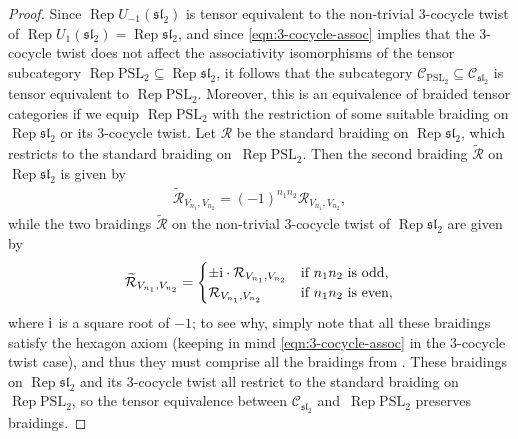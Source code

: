 \documentclass[pdftex]{sigma}
\numberwithin{equation}{section}
\theoremstyle{definition}
\begin{document}
\begin{proof}
Since $\operatorname{Rep} U_{-1}(\mathfrak{sl}_2)$ is tensor equivalent to the non-trivial $3$-cocycle twist of $\operatorname{Rep} U_1(\mathfrak{sl}_2)=\operatorname{Rep} \mathfrak{sl}_2$, and since \eqref{eqn:3-cocycle-assoc} implies that the $3$-cocycle twist does not affect the associativity isomorphisms of the tensor subcategory $\operatorname{Rep} \mathrm{PSL}_2\subseteq \operatorname{Rep}\mathfrak{sl}_2$, it follows that the subcategory $\mathcal{C}_{\mathrm{PSL}_2}\subseteq\mathcal{C}_{\mathfrak{sl}_2}$ is tensor equivalent to $\operatorname{Rep} \mathrm{PSL}_2$.
Moreover, this is an equivalence of braided tensor categories if we equip $\operatorname{Rep} \mathrm{PSL}_2$ with the restriction of some suitable braiding on $\operatorname{Rep} \mathfrak{sl}_2$ or its $3$-cocycle twist.
Let $\mathcal{R}$ be the standard braiding on $\operatorname{Rep} \mathfrak{sl}_2$, which restricts to the standard braiding on~$\operatorname{Rep} \mathrm{PSL}_2$. Then the second braiding $\widetilde{\mathcal{R}}$ on~$\operatorname{Rep} \mathfrak{sl}_2$ is given by
\begin{gather*}
\widetilde{\mathcal{R}}_{V_{n_1},V_{n_2}} = (-1)^{n_1 n_2}\mathcal{R}_{V_{n_1},V_{n_2}},
\end{gather*}
while the two braidings $\widetilde{\mathcal{R}}$ on the non-trivial $3$-cocycle twist of $\operatorname{Rep} \mathfrak{sl}_2$ are given by
\begin{gather*}
\widetilde{\mathcal{R}}_{V_{n_1},V_{n_2}} =\begin{cases}
\pm {\rm i}\cdot\mathcal{R}_{V_{n_1},V_{n_2}} & \text{if } n_1 n_2 \text{ is odd},\\
\mathcal{R}_{V_{n_1},V_{n_2}} & \text{if } n_1 n_2 \text{ is even},\\
\end{cases}
\end{gather*}
where ${\rm i}$ is a square root of $-1$; to see why, simply note that all these braidings satisfy the hexagon axiom (keeping in mind \eqref{eqn:3-cocycle-assoc} in the $3$-cocycle twist case), and thus they must comprise all the braidings from \cite[Proposition 6.3]{GaNe}. These braidings on $\operatorname{Rep} \mathfrak{sl}_2$ and its $3$-cocycle twist all restrict to the standard braiding on $\operatorname{Rep} \mathrm{PSL}_2$, so the tensor equivalence between $\mathcal{C}_{\mathfrak{sl}_2}$ and~$\operatorname{Rep} \mathrm{PSL}_2$ preserves braidings.
\end{proof}
\end{document}
